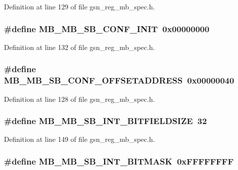 Definition at line 129 of file gsn\_\-reg\_\-mb\_\-spec.h.

\hypertarget{a00562_a0e59128258090e0876da2a9d3d97eb35}{
\subsubsection[{MB\_\-MB\_\-SB\_\-CONF\_\-INIT}]{\setlength{\rightskip}{0pt plus 5cm}\#define MB\_\-MB\_\-SB\_\-CONF\_\-INIT~0x00000000}}
\label{a00562_a0e59128258090e0876da2a9d3d97eb35}


Definition at line 132 of file gsn\_\-reg\_\-mb\_\-spec.h.

\hypertarget{a00562_a0d5619e4ffe0e525c9e1fa6d4deeeb3f}{
\subsubsection[{MB\_\-MB\_\-SB\_\-CONF\_\-OFFSETADDRESS}]{\setlength{\rightskip}{0pt plus 5cm}\#define MB\_\-MB\_\-SB\_\-CONF\_\-OFFSETADDRESS~0x00000040}}
\label{a00562_a0d5619e4ffe0e525c9e1fa6d4deeeb3f}


Definition at line 128 of file gsn\_\-reg\_\-mb\_\-spec.h.

\hypertarget{a00562_a557683e53761f00bd9c5c0bf723fbc0a}{
\subsubsection[{MB\_\-MB\_\-SB\_\-INT\_\-BITFIELDSIZE}]{\setlength{\rightskip}{0pt plus 5cm}\#define MB\_\-MB\_\-SB\_\-INT\_\-BITFIELDSIZE~32}}
\label{a00562_a557683e53761f00bd9c5c0bf723fbc0a}


Definition at line 149 of file gsn\_\-reg\_\-mb\_\-spec.h.

\hypertarget{a00562_a217857e753f22631a4ea74b7166c22df}{
\subsubsection[{MB\_\-MB\_\-SB\_\-INT\_\-BITMASK}]{\setlength{\rightskip}{0pt plus 5cm}\#define MB\_\-MB\_\-SB\_\-INT\_\-BITMASK~0xFFFFFFFF}}
\label{a00562_a217857e753f22631a4ea74b7166c22df}


